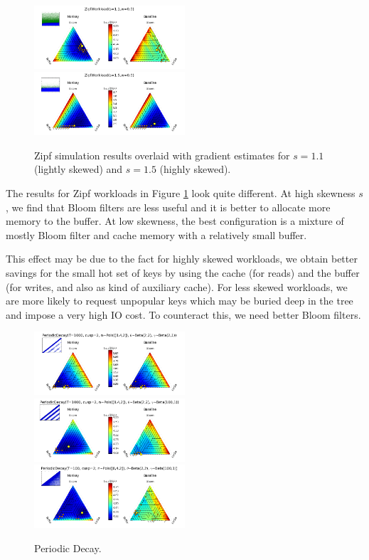 \documentclass{cidr-2019}
\begin{document}
\begin{figure}[!htb]
\begin{center}
\includegraphics[width=0.5\textwidth]{zipfquiv1.png}
\includegraphics[width=0.5\textwidth]{zipfquiv2.png}
\end{center}
\caption{Zipf simulation results overlaid with gradient estimates for $s=1.1$
(lightly skewed) and $s=1.5$ (highly skewed).}
\label{fig:zipfquiv}
\end{figure}

The results for Zipf workloads in Figure \ref{fig:zipfquiv} look quite
different. At high skewness $s$, we find that Bloom filters are less useful and
it is better to allocate more memory to the buffer. At low skewness, the best
configuration is a mixture of mostly Bloom filter and cache memory with a
relatively small buffer.

This effect may be due to the fact for highly skewed workloads, we obtain
better savings for the small hot set of keys by using the cache (for reads) and
the buffer (for writes, and also as kind of auxiliary cache). For less skewed
workloads, we are more likely to request unpopular keys which may be buried
deep in the tree and impose a very high IO cost. To counteract this, we need
better Bloom filters.

\begin{figure}[!htb]
\begin{center}
\includegraphics[width=0.5\textwidth]{periodquiv3.png}
\includegraphics[width=0.5\textwidth]{periodquiv2.png}
\includegraphics[width=0.5\textwidth]{periodquiv1.png}
\end{center}
\caption{Periodic Decay.}
\label{fig:periodquiv}
\end{figure}
\end{document}
